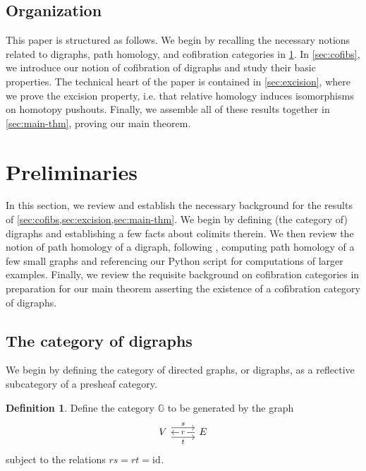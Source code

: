 \documentclass[11pt]{article}
\theoremstyle{definition}
\newtheorem{defi}[theo]{Definition}
\numberwithin{equation}{section}
\newcommand{\id}[1][]{\mathrm{id}_{#1}}
\begin{document}
\subsection{Organization}
This paper is structured as follows.
We begin by recalling the necessary notions related to digraphs, path homology, and cofibration categories in \cref{sec:preliminaries}.
In \cref{sec:cofibs}, we introduce our notion of cofibration of digraphs and study their basic properties.
The technical heart of the paper is contained in \cref{sec:excision}, where we prove the excision property, i.e. that relative homology induces isomorphisms on homotopy pushouts.
Finally, we assemble all of these results together in \cref{sec:main-thm}, proving our main theorem.

\section{Preliminaries} \label{sec:preliminaries}

In this section, we review and establish the necessary background for the results of \cref{sec:cofibs,sec:excision,sec:main-thm}.
We begin by defining (the category of) digraphs and establishing a few facts about colimits therein.
We then review the notion of path homology of a digraph, following \cite{grigor'yan-lin-muranov-yau:unpublished,grigor'yan-lin-muranov-yau:homotopy,grigor'yan-lin-muranov-yau}, computing path homology of a few small graphs and referencing our Python script \cite{python_script} for computations of larger examples.
Finally, we review the requisite background on cofibration categories in preparation for our main theorem asserting the existence of a cofibration category of digraphs.

\subsection{The category of digraphs}

We begin by defining the category of directed graphs, or digraphs, as a reflective subcategory of a presheaf category.

\begin{defi}
     Define the category $\mathbb{G}$ to be generated by the graph
 \[   \begin{tikzcd}
    V\rar["s",shift left=2] \rar["t"',shift right=2] & E\lar["r" description]
    \end{tikzcd}\]
    subject to the relations $rs=rt=\id$.
\end{defi}
\end{document}
